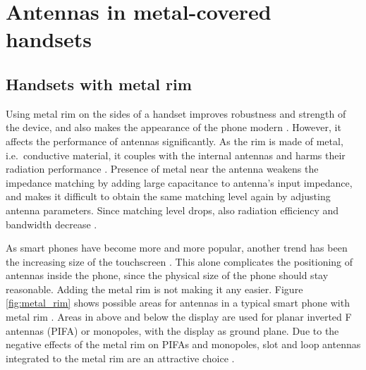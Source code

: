 \section{Antennas in metal-covered handsets}
\label{sec:metal_cover}

\subsection{Handsets with metal rim}
\label{sec:metal_rim}
Using metal rim on the sides of a handset improves robustness and strength of the device, and also makes the appearance of the phone modern \cite{ban_dual_loop, hsu_compact, yuan_slot}. However, it affects the performance of antennas significantly. As the rim is made of metal, i.e.\ conductive material, it couples with the internal antennas and harms their radiation performance \cite{ban_dual_loop}. Presence of metal near the antenna weakens the impedance matching by adding large capacitance to antenna's input impedance, and makes it difficult to obtain the same matching level again by adjusting antenna parameters. Since matching level drops, also radiation efficiency and bandwidth decrease \cite{ban_dual_loop, hsu_compact, yuan_slot}.

As smart phones have become more and more popular, another trend has been the increasing size of the touchscreen \cite{ban_low_profile}. This alone complicates the positioning of antennas inside the phone, since the physical size of the phone should stay reasonable. Adding the metal rim is not making it any easier. Figure \ref{fig:metal_rim} shows possible areas for antennas in a typical smart phone with metal rim \cite{hsu_compact}. Areas in above and below the display are used for planar inverted F antennas (PIFA) or monopoles, with the display as ground plane. Due to the negative effects of the metal rim on PIFAs and monopoles, slot and loop antennas integrated to the metal rim are an attractive choice \cite{hsu_compact, ban_dual_loop}.

